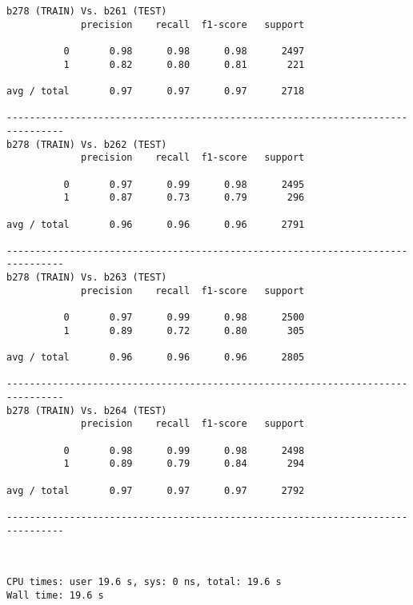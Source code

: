 \documentclass[11pt]{article}
\begin{document}
    \begin{Verbatim}[commandchars=\\\{\}]
b278 (TRAIN) Vs. b261 (TEST)
             precision    recall  f1-score   support

          0       0.98      0.98      0.98      2497
          1       0.82      0.80      0.81       221

avg / total       0.97      0.97      0.97      2718

--------------------------------------------------------------------------------
b278 (TRAIN) Vs. b262 (TEST)
             precision    recall  f1-score   support

          0       0.97      0.99      0.98      2495
          1       0.87      0.73      0.79       296

avg / total       0.96      0.96      0.96      2791

--------------------------------------------------------------------------------
b278 (TRAIN) Vs. b263 (TEST)
             precision    recall  f1-score   support

          0       0.97      0.99      0.98      2500
          1       0.89      0.72      0.80       305

avg / total       0.96      0.96      0.96      2805

--------------------------------------------------------------------------------
b278 (TRAIN) Vs. b264 (TEST)
             precision    recall  f1-score   support

          0       0.98      0.99      0.98      2498
          1       0.89      0.79      0.84       294

avg / total       0.97      0.97      0.97      2792

--------------------------------------------------------------------------------

    \end{Verbatim}

    \begin{center}
    \end{center}
    { \hspace*{\fill} \\}
    
    \begin{Verbatim}[commandchars=\\\{\}]
CPU times: user 19.6 s, sys: 0 ns, total: 19.6 s
Wall time: 19.6 s

    \end{Verbatim}
\end{document}

